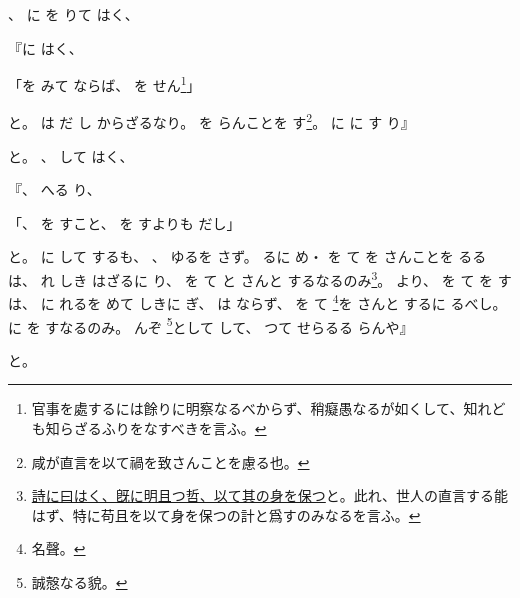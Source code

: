 \documentclass[a4paper,12pt]{article}
\begin{document}
、%
に%
を%
りて%
はく、%
\begin{quoting}
『に%
はく、%
\begin{quoting}
「を%
みて%
ならば、%
を%
せん\footnote{官事を處するには餘りに明察なるべからず、稍癡愚なるが如くして、知れども知らざるふりをなすべきを言ふ。}」
\end{quoting}
と。%
は%
だ%
し%
からざるなり。%
を%
らんことを%
す\footnote{咸が直言を以て禍を致さんことを慮る也。}。%
に%
に%
す%
り』
\end{quoting}
と。%
、%
して%
はく、%
\begin{quoting}
『、%
へる%
り、%
\begin{quoting}
「、%
を%
すこと、%
を%
すよりも%
だし」
\end{quoting}
と。%
に%
して%
するも、%
、%
ゆるを%
さず。%
るに%
め・%
を%
て%
を%
さんことを%
るるは、%
れ%
%
しき%
はざるに%
り、%
を%
て%
と%
さんと%
するなるのみ\footnote{\href{https://ctext.org/book-of-poetry/zheng-min/zh?searchu=\%E6\%97\%A2\%E6\%98\%8E\%E4\%B8\%94\%E5\%93\%B2\%E3\%80\%81\%E4\%BB\%A5\%E4\%BF\%9D\%E5\%85\%B6\%E8\%BA\%AB\&searchmode=showall\#result}{詩に曰はく、旣に明且つ哲、以て其の身を保つ}と。此れ、世人の直言する能はず、特に苟且を以て身を保つの計と爲すのみなるを言ふ。}。%
より、%
を%
て%
を%
す%
は、%
に%
れるを%
めて%
しきに%
ぎ、%
は%
ならず、%
を%
て%
\footnote{名聲。}を%
さんと%
するに%
るべし。%
に%
を%
すなるのみ。%
んぞ%
\footnote{誠慤なる貌。}として%
して、%
つて%
せらるる%
らんや』
\end{quoting}
と。%
\end{document}
